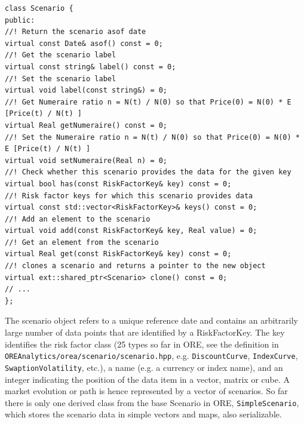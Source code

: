 \documentclass[12pt, a4paper]{report}
\begin{document}
\begin{listing}[H]
\begin{verbatim}
class Scenario {
public:
//! Return the scenario asof date
virtual const Date& asof() const = 0;
//! Get the scenario label
virtual const string& label() const = 0;
//! Set the scenario label
virtual void label(const string&) = 0;
//! Get Numeraire ratio n = N(t) / N(0) so that Price(0) = N(0) * E [Price(t) / N(t) ]
virtual Real getNumeraire() const = 0;
//! Set the Numeraire ratio n = N(t) / N(0) so that Price(0) = N(0) * E [Price(t) / N(t) ]
virtual void setNumeraire(Real n) = 0;
//! Check whether this scenario provides the data for the given key
virtual bool has(const RiskFactorKey& key) const = 0;
//! Risk factor keys for which this scenario provides data
virtual const std::vector<RiskFactorKey>& keys() const = 0;
//! Add an element to the scenario
virtual void add(const RiskFactorKey& key, Real value) = 0;
//! Get an element from the scenario
virtual Real get(const RiskFactorKey& key) const = 0;
//! clones a scenario and returns a pointer to the new object
virtual ext::shared_ptr<Scenario> clone() const = 0;
// ...
};
\end{verbatim}
\caption{Excerpt of the Scenario data class.}
\label{1st:scenario}
\end{listing}

The scenario object refers to a unique reference date and contains an arbitrarily large number of data points that are identified by a RiskFactorKey. The key identifies the risk factor class (25 types so far in ORE, see the definition in
{\tt OREAnalytics/orea/scenario/scenario.hpp}, e.g. {\tt DiscountCurve}, {\tt IndexCurve}, {\tt SwaptionVolatility}, etc.), a name (e.g. a currency or index name), and an integer indicating the position of the data item in a vector, matrix or cube. A market
evolution or path is hence represented by a vector of scenarios. So far there is only one derived class from the base Scenario in ORE, {\tt SimpleScenario}, which stores the scenario data in simple vectors and maps, also serializable.
\end{document}
